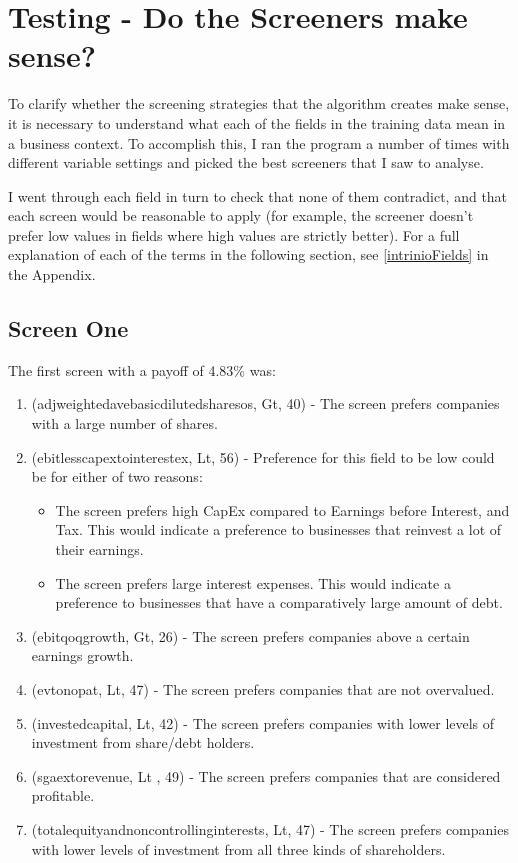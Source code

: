 \section{Testing - Do the Screeners make sense?}
To clarify whether the screening strategies that the algorithm creates make sense, it is necessary to understand what each of the fields in the training data mean in a business context. To accomplish this, I ran the program a number of times with different variable settings and picked the best screeners that I saw to analyse. \newline

I went through each field in turn to check that none of them contradict, and that each screen would be reasonable to apply (for example, the screener doesn't prefer low values in fields where high values are strictly better). For a full explanation of each of the terms in the following section, see \ref{intrinioFields} in the Appendix.

\subsection{Screen One}
The first screen with a payoff of 4.83\% was:
\begin{enumerate}
    \item (adjweightedavebasicdilutedsharesos, Gt, 40) - The screen prefers companies with a large number of shares.
    \item (ebitlesscapextointerestex, Lt, 56) - Preference for this field to be low could be for either of two reasons:
    \begin{itemize}
        \item The screen prefers high CapEx compared to Earnings before Interest, and Tax. This would indicate a preference to businesses that reinvest a lot of their earnings.
        \item The screen prefers large interest expenses. This would indicate a preference to businesses that have a comparatively large amount of debt.
    \end{itemize}
    \item (ebitqoqgrowth, Gt, 26) - The screen prefers companies above a certain earnings growth.
    \item (evtonopat, Lt, 47) - The screen prefers companies that are not overvalued.
    \item (investedcapital, Lt, 42) - The screen prefers companies with lower levels of investment from share/debt holders.
    \item (sgaextorevenue, Lt , 49) - The screen prefers companies that are considered profitable.
    \item (totalequityandnoncontrollinginterests, Lt, 47) - The screen prefers companies with lower levels of investment from all three kinds of shareholders.
\end{enumerate}

